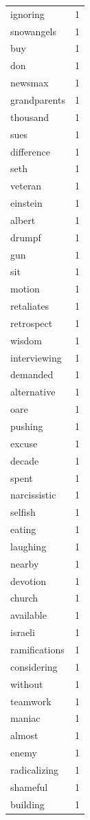 \begin{tabular}{lr}
ignoring & 1 \\
snowangels & 1 \\
buy & 1 \\
don & 1 \\
newsmax & 1 \\
grandparents & 1 \\
thousand & 1 \\
sues & 1 \\
difference & 1 \\
seth & 1 \\
veteran & 1 \\
einstein & 1 \\
albert & 1 \\
drumpf & 1 \\
gun & 1 \\
sit & 1 \\
motion & 1 \\
retaliates & 1 \\
retrospect & 1 \\
wisdom & 1 \\
interviewing & 1 \\
demanded & 1 \\
alternative & 1 \\
oare & 1 \\
pushing & 1 \\
excuse & 1 \\
decade & 1 \\
spent & 1 \\
narcissistic & 1 \\
selfish & 1 \\
eating & 1 \\
laughing & 1 \\
nearby & 1 \\
devotion & 1 \\
church & 1 \\
available & 1 \\
israeli & 1 \\
ramifications & 1 \\
considering & 1 \\
without & 1 \\
teamwork & 1 \\
maniac & 1 \\
almost & 1 \\
enemy & 1 \\
radicalizing & 1 \\
shameful & 1 \\
building & 1 \\

\end{tabular}
